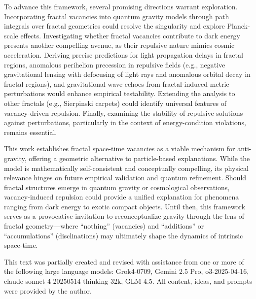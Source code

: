 \documentclass[%
  reprint,
  superscriptaddress,
  showpacs,
  showkeys,
  amsmath,amssymb,
  pra,
  longbibliography,
  floatfix,
]{revtex4-2}
\begin{document}
To advance this framework, several promising directions warrant exploration.
Incorporating fractal vacancies into quantum gravity models through path integrals
over fractal geometries could resolve the singularity and explore Planck-scale effects.
Investigating whether fractal vacancies contribute to dark energy presents another compelling avenue,
as their repulsive nature mimics cosmic acceleration.
Deriving precise predictions for light propagation delays in fractal regions,
anomalous perihelion precession in repulsive fields (e.g., negative gravitational lensing with defocusing of light rays and anomalous orbital decay in fractal regions),
and gravitational wave echoes from fractal-induced metric perturbations would enhance empirical testability.
Extending the analysis to other fractals (e.g., Sierpinski carpets) could identify universal features of vacancy-driven repulsion.
Finally, examining the stability of repulsive solutions against perturbations, particularly in the context of energy-condition violations, remains essential.

This work establishes fractal space-time vacancies as a viable mechanism for anti-gravity,
offering a geometric alternative to particle-based explanations.
 While the model is mathematically self-consistent and conceptually compelling,
its physical relevance hinges on future empirical validation and quantum refinement.
Should fractal structures emerge in quantum gravity or cosmological observations,
vacancy-induced repulsion could provide a unified explanation for phenomena ranging from dark energy to exotic compact objects.
Until then, this framework serves as a provocative invitation to reconceptualize gravity
through the lens of fractal geometry---where ``nothing'' (vacancies) and ``additions'' or ``accumulations'' (disclinations) may ultimately shape the dynamics of intrinsic space-time.

\begin{acknowledgments}
This text was partially created and revised with assistance from one or more of the following large language models: Grok4-0709, Gemini 2.5 Pro, o3-2025-04-16, claude-sonnet-4-20250514-thinking-32k, GLM-4.5. All content, ideas, and prompts were provided by the author.
\end{acknowledgments}


\end{document}
